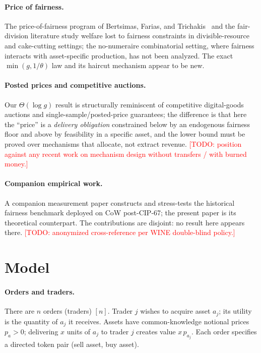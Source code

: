 \documentclass[11pt]{article}
\newcommand{\todo}[1]{\textcolor{red}{[TODO: #1]}}
\theoremstyle{remark}
\begin{document}
\paragraph{Price of fairness.}
The price-of-fairness program of Bertsimas, Farias, and
Trichakis~\cite{bertsimas2011} and the fair-division literature
\cite{caragiannis2012} study welfare lost to fairness constraints in
divisible-resource and cake-cutting settings; the no-numeraire combinatorial
setting, where fairness interacts with asset-specific production, has not
been analyzed. The exact $\min(g,1/\theta)$ law and its haircut mechanism
appear to be new.

\paragraph{Posted prices and competitive auctions.}
Our $\Theta(\log g)$ result is structurally reminiscent of competitive
digital-goods auctions \cite{goldberg2006} and single-sample/posted-price
guarantees; the difference is that here the ``price'' is a \emph{delivery
obligation} constrained below by an endogenous fairness floor and above by
feasibility in a specific asset, and the lower bound must be proved over
mechanisms that allocate, not extract revenue. \todo{position against any
recent work on mechanism design without transfers / with burned money.}

\paragraph{Companion empirical work.}
A companion measurement paper \cite{companion} constructs and stress-tests
the historical fairness benchmark deployed on CoW post-CIP-67; the present
paper is its theoretical counterpart. The contributions are disjoint:
no result here appears there. \todo{anonymized cross-reference per WINE
double-blind policy.}

\section{Model}\label{sec:model}

\paragraph{Orders and traders.}
There are $n$ orders (traders) $[n]$. Trader $j$ wishes to acquire asset
$a_j$; its utility is the quantity of $a_j$ it receives. Assets have
common-knowledge notional prices $p_a>0$; delivering $x$ units of $a_j$ to
trader $j$ creates value $x\,p_{a_j}$. Each order specifies a directed token
pair (sell asset, buy asset).
\end{document}
